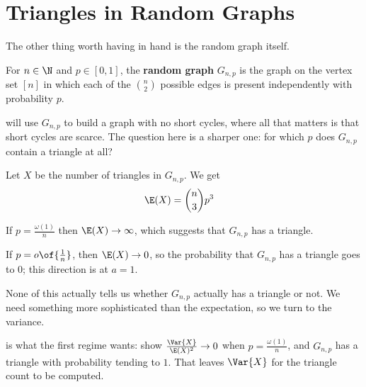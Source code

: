 \section{Triangles in Random Graphs}

The other thing worth having in hand is the random graph itself.

\begin{boxdefinition} \label{Ch1:Def:Random_Graph}
    For $n \in \N$ and $p \in [0, 1]$, the \textbf{random graph} $G_{n, p}$ is the graph on the vertex set $[n]$ in which each of the $\binom{n}{2}$ possible edges is present independently with probability $p$.
\end{boxdefinition}

 will use $G_{n, p}$ to build a graph with no short cycles, where all that matters is that short cycles are scarce. The question here is a sharper one: for which $p$ does $G_{n, p}$ contain a triangle at all?

Let $X$ be the number of triangles in $G_{n, p}$. We get
\begin{align*}
    \E(X) &= \binom{n}{3} p^3
\end{align*}

If $p = \frac{\omega(1)}{n}$ then $\E(X) \to \infty$, which suggests that $G_{n, p}$ has a triangle.

If $p = o\of{\frac{1}{n}}$, then $\E(X) \to 0$, so the probability that $G_{n, p}$ has a triangle goes to $0$; this direction is  at $a = 1$.

None of this actually tells us whether $G_{n, p}$ actually has a triangle or not. We need something more sophisticated than the expectation, so we turn to the variance.

 is what the first regime wants: show $\frac{\Var{X}}{\E(X)^2} \to 0$ when $p = \frac{\omega(1)}{n}$, and $G_{n, p}$ has a triangle with probability tending to $1$. That leaves $\Var{X}$ for the triangle count to be computed. \sorry
